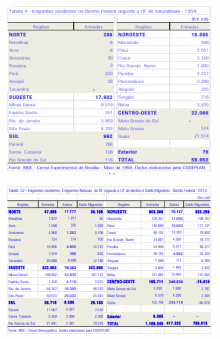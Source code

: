\begin{figure}[h]
    \centering
    \includegraphics[width=0.7\linewidth]{fig/imigrantes-1959}
    \caption{}
\end{figure}

\begin{figure}[h]
    \centering
    \includegraphics[width=0.7\linewidth]{fig/imigrantes-2010}
    \caption{}
    \label{fig:imigrantes-2010}
\end{figure}
